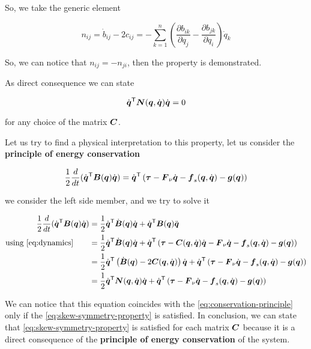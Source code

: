 So, we take the generic element

\[
	n_{ij} = \dot{b}_{ij} - 2 c_{ij} = - \sum_{k=1}^n \left( \frac{\partial b_{ik}}{\partial q_j} - \frac{\partial b_{jk}}{\partial q_i} \right) \dot{q}_k
\]

So, we can notice that  $n_{ij} = - n_{ji}$, then the property is demonstrated.

As direct consequence we can state

\begin{equation}
    \dq^\trans \matr N(\q,\dq) \dq = 0 \label{eq:skew-symmetry-property}
\end{equation}

for any choice of the matrix $\matr C$.

Let us try to find a physical interpretation to this property, let us consider the \textbf{principle of energy conservation}

\begin{equation}
    \frac{1}{2} \frac{d}{dt} (\dq^\trans \matr B(\q)\dq) = \dq^\trans \left( \vect \tau - \matr{F}_\nu\dq - \matr{f}_s(\q,\dq) - \vect{g}(\q) \right) \label{eq:conservation-principle}
\end{equation}

we consider the left side member, and we try to solve it

\begin{align*}
    \frac{1}{2} \frac{d}{dt} (\dq^\trans \matr B(\q)\dq) &= \frac{1}{2} \dq^\trans \dot{\matr B}(\q)\dq + \dq^\trans \matr B(\q)\ddq \\
    \text{using \ref{eq:dynamics}} \qquad &= \frac{1}{2} \dq^\trans \dot{\matr B}(\q)\dq + \dq^\trans \left( \vect{\tau} - \matr{C}(\q,\dq)\dq - \matr{F}_\nu\dq - \matr{f}_s(\q,\dq) - \vect{g}(\q) \right) \\
	&= \frac{1}{2} \dq^\trans \left( \dot{\matr B}(\q) - 2 \matr{C}(\q,\dq) \right)\dq + \dq^\trans \left( \vect{\tau} - \matr{F}_\nu\dq - \matr{f}_s(\q,\dq) - \vect{g}(\q) \right) \\
    &= \frac{1}{2} \dq^\trans \matr N(\q,\dq) \dq + \dq^\trans \left( \vect{\tau} - \matr{F}_\nu\dq - \matr{f}_s(\q,\dq) - \vect{g}(\q) \right)
\end{align*}

We can notice that this equation coincides with the \autoref{eq:conservation-principle} only if the \autoref{eq:skew-symmetry-property} is satisfied.
In conclusion, we can state that \autoref{eq:skew-symmetry-property} is satisfied for each matrix $\matr C$ because it is a direct consequence of the \textbf{principle of energy conservation} of the system.

